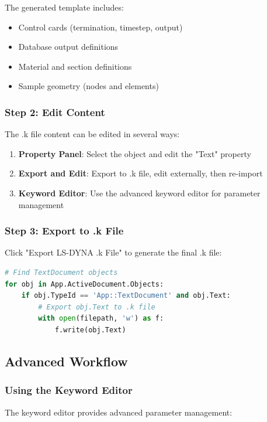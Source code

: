\documentclass[12pt,a4paper]{article}
\begin{document}
The generated template includes:
\begin{itemize}
    \item Control cards (termination, timestep, output)
    \item Database output definitions
    \item Material and section definitions
    \item Sample geometry (nodes and elements)
\end{itemize}

\subsubsection{Step 2: Edit Content}
The .k file content can be edited in several ways:

\begin{enumerate}
    \item \textbf{Property Panel}: Select the object and edit the "Text" property
    \item \textbf{Export and Edit}: Export to .k file, edit externally, then re-import
    \item \textbf{Keyword Editor}: Use the advanced keyword editor for parameter management
\end{enumerate}

\subsubsection{Step 3: Export to .k File}
Click "Export LS-DYNA .k File" to generate the final .k file:

\begin{lstlisting}[language=Python, caption=Export functionality]
# Find TextDocument objects
for obj in App.ActiveDocument.Objects:
    if obj.TypeId == 'App::TextDocument' and obj.Text:
        # Export obj.Text to .k file
        with open(filepath, 'w') as f:
            f.write(obj.Text)
\end{lstlisting}

\subsection{Advanced Workflow}

\subsubsection{Using the Keyword Editor}
The keyword editor provides advanced parameter management:
\end{document}
